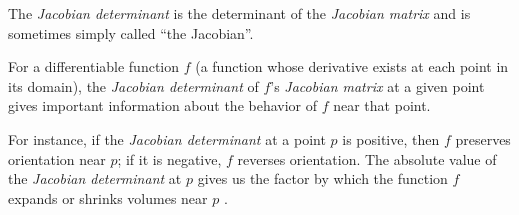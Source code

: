 The \textit{Jacobian determinant} is the determinant of the
\textit{Jacobian matrix} and is sometimes simply called ``the
Jacobian''.

For a differentiable function $f$ (a function whose derivative exists
at each point in its domain), the \textit{Jacobian determinant} of
$f$'s \textit{Jacobian matrix} at a given point gives important
information about the behavior of $f$ near that point.

For instance, if the \textit{Jacobian determinant} at a point $p$ is
positive, then $f$ preserves orientation near $p$; if it is negative,
$f$ reverses orientation. The absolute value of the \textit{Jacobian
  determinant} at $p$ gives us the factor by which the function $f$
expands or shrinks volumes near $p$ \cite{jacobian}.




